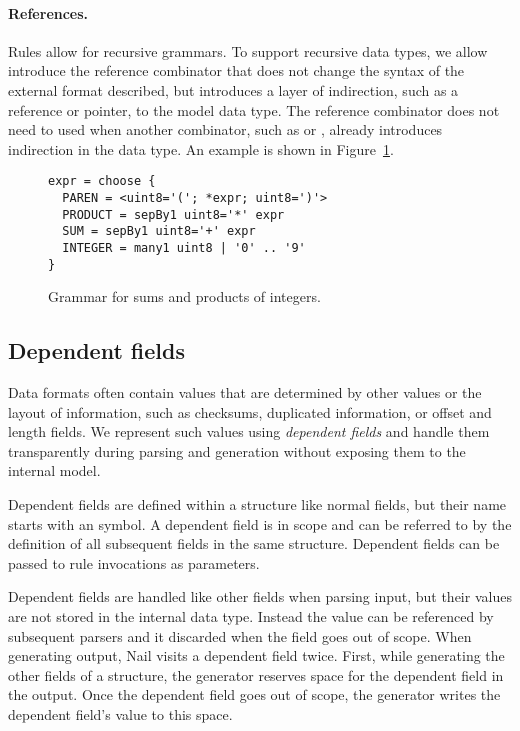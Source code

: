 \paragraph{References.}
Rules allow for recursive grammars. To support recursive data types, we allow introduce the
reference combinator \cc{*}  that does not change the syntax of the external format described, but
introduces a layer of indirection, such as a reference or pointer, to the model data type.
The reference combinator does not need to used when another combinator, such as  or
, already introduces indirection in the data type. An example is shown in Figure~\ref{fig:grammar-arith}.

\begin{figure}
\begin{verbatim}
expr = choose {
  PAREN = <uint8='('; *expr; uint8=')'>
  PRODUCT = sepBy1 uint8='*' expr
  SUM = sepBy1 uint8='+' expr
  INTEGER = many1 uint8 | '0' .. '9'
}
\end{verbatim}
\caption{Grammar for sums and products of integers.}
\label{fig:grammar-arith}
\end{figure}



\subsection{Dependent fields}
\label{s:dependent}
Data formats often contain values that are determined by other values or the layout of information,
such as checksums, duplicated information, or offset and  length fields.
We represent such values using \emph{dependent fields} and handle them transparently during
parsing and generation without exposing them to the internal model. 


Dependent fields are defined within a structure like normal fields, but their name starts with an  symbol.
A dependent field is in scope and can be referred to by the definition of all subsequent fields in
the same structure. Dependent fields can be passed to rule invocations as parameters.

Dependent fields are handled like other fields when parsing input, but their values are not stored
in the internal data type. Instead the value can be referenced by subsequent parsers and it
discarded when the field goes out of scope.
When generating output, Nail visits a dependent field twice. First, while generating the other fields of a
structure, the generator reserves space for the dependent field in the output. Once
the dependent field goes out of scope, the generator  writes the
dependent field's value to this space.


